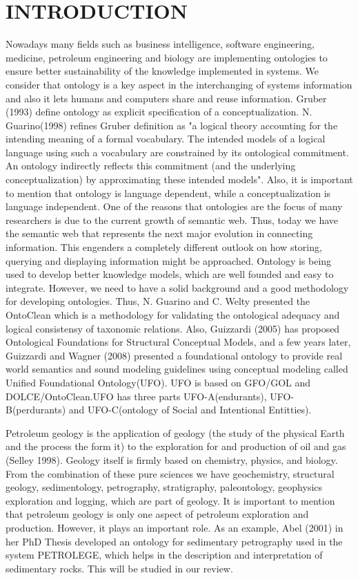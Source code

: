 \chapter{INTRODUCTION}
Nowadays many fields such as business intelligence, software engineering, medicine, petroleum engineering and biology are implementing ontologies to ensure better sustainability of the knowledge implemented in systems.  We consider that ontology is a key aspect in the interchanging of systems information and also it lets humans and computers share and reuse information. Gruber (1993) define ontology as explicit specification of a conceptualization. N. Guarino(1998) refines Gruber definition as "a logical theory accounting for the intending meaning of a formal vocabulary. The intended models of a logical language using such a vocabulary are constrained by its ontological commitment. An ontology indirectly reflects this commitment (and the underlying conceptualization) by approximating these intended models". Also, it is important to mention that ontology is language dependent, while a conceptualization is language independent. One of the reasons that ontologies are the focus of many researchers is due to the current growth of semantic web. Thus, today we have the semantic web that represents the next major evolution in connecting information. This engenders a completely different outlook on how storing, querying and displaying information might be approached. Ontology is being used to develop better knowledge models, which are well founded and easy to integrate. However, we need to have a solid background and a good methodology for developing ontologies. Thus, N. Guarino and C. Welty presented the OntoClean which is a methodology for validating the ontological adequacy and logical consistensy of taxonomic relations. Also, Guizzardi (2005) has proposed Ontological Foundations for Structural Conceptual Models, and a few years later, Guizzardi and Wagner (2008) presented a foundational ontology to provide real world semantics and sound modeling guidelines using conceptual modeling called Unified Foundational Ontology(UFO). UFO is based on GFO/GOL  and DOLCE/OntoClean.UFO has three parts UFO-A(endurants), UFO-B(perdurants) and UFO-C(ontology of Social and Intentional Entitties).

Petroleum geology is the application of  geology (the study of the physical Earth and the process the form it) to the exploration for and production of oil and gas (Selley 1998). Geology itself is firmly based on chemistry, physics, and biology. From the combination of these pure sciences we have geochemistry, structural geology, sedimentology, petrography, stratigraphy, paleontology, geophysics exploration and logging, which are part of geology. It is important to mention that petroleum geology is only one aspect of petroleum exploration and production. However, it plays an important role. As an example,  Abel (2001) in her PhD Thesis developed an ontology for sedimentary petrography used in the system PETROLEGE, which helps in the description and interpretation of sedimentary rocks. This will be studied in our review. 

